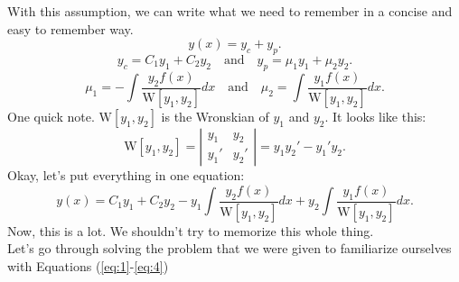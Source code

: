 \documentclass[a4paper,12pt]{article}
\begin{document}
With this assumption, we can write what we need to remember in a concise and easy to remember way.
\begin{equation}
	y(x) = y_c + y_p. \label{eq:1}
\end{equation}
\begin{equation}
	y_c = C_1y_1 + C_2y_2  \quad \text{and}\quad y_p = \mu_1y_1 + \mu_2y_2. \label{eq:2}
\end{equation}
\begin{equation}
	\mu_1 = -\int \frac{y_2f(x)}{\mathrm{W}[y_1,y_2]}dx \quad\text{and} \quad \mu_2 = \int \frac{y_1f(x)}{\mathrm{W}[y_1,y_2]}dx. \label{eq:3}
\end{equation}
One quick note. $\mathrm{W}[y_1,y_2]$ is the Wronskian of $y_1$ and $y_2$. It looks like this:
\begin{equation}
	\mathrm{W}[y_1,y_2] = \left|\begin{matrix}
	y_1 & y_2 \\
	y_1' & y_2'
\end{matrix}\right| = y_1y_2' - y_1'y_2. \label{eq:4}
\end{equation}
Okay, let's put everything in one equation:
$$ \boxed{y(x) = C_1y_1 + C_2y_2 -y_1\int \frac{y_2f(x)}{\mathrm{W}[y_1,y_2]}dx + y_2 \int \frac{y_1f(x)}{\mathrm{W}[y_1,y_2]}dx.} $$
Now, this is a lot. We shouldn't try to memorize this whole thing.\\

Let's go through solving the problem that we were given to familiarize ourselves with Equations (\ref{eq:1}-\ref{eq:4})\\
\end{document}
